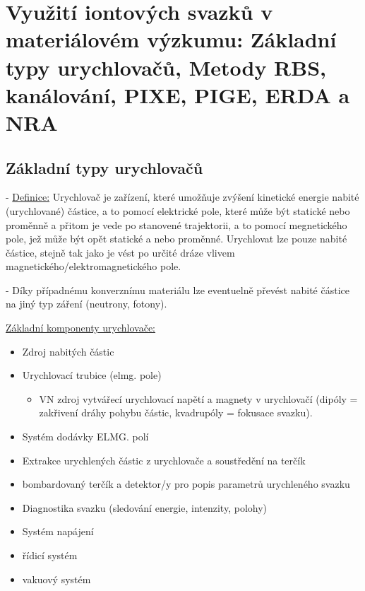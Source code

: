 \newpage

\section{Využití iontových svazků v materiálovém výzkumu: Základní typy urychlovačů, Metody RBS, kanálování, PIXE, PIGE, ERDA a NRA}

\subsection{Základní typy urychlovačů}

- \underline{Definice:} Urychlovač je zařízení, které umožňuje zvýšení kinetické energie nabité (urychlované) částice, a to pomocí elektrické pole, které může být statické nebo proměnně a přitom je vede po stanovené trajektorii, a to pomocí megnetického pole, jež může být opět statické a nebo proměnné. Urychlovat lze pouze nabité částice, stejně tak jako je vést po určité dráze vlivem magnetického/elektromagnetického pole.

- Díky případnému konverznímu materiálu lze eventuelně převést nabité částice na jiný typ záření (neutrony, fotony).

\underline{Základní komponenty urychlovače:}

\begin{itemize}
    \item Zdroj nabitých částic
    \item Urychlovací trubice (elmg. pole)
    \begin{itemize}
        \item VN zdroj vytvářecí urychlovací napětí a magnety v urychlovačí (dipóly = zakřivení dráhy pohybu částic, kvadrupóly = fokusace svazku).
    \end{itemize}
    \item Systém dodávky ELMG. polí
    \item Extrakce urychlených částic z urychlovače a soustředění na terčík
    \item bombardovaný terčík a detektor/y pro popis parametrů urychleného svazku
    \item Diagnostika svazku (sledování energie, intenzity, polohy)
    \item Systém napájení
    \item řídicí systém
    \item vakuový systém

\end{itemize}

